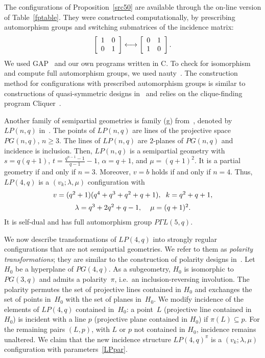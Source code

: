 \documentclass[12pt, reqno]{amsart}
\begin{document}
The configurations of Proposition~\ref{src50} are
available through the on-line version of Table~\ref{fptable}. They were
constructed computationally, by prescribing automorphism groups and
switching submatrices of the incidence matrix:
$$\left[\begin{array}{c c} 1 & 0\\ 0 & 1\\ \end{array}\right] \longleftrightarrow
\left[\begin{array}{c c} 0 & 1\\ 1 & 0\\ \end{array}\right].$$
We used GAP~\cite{GAP4} and our own programs written in C. To check for
isomorphism and compute full automorphism groups, we used nauty~\cite{MP14}.
The construction method for configurations with prescribed automorphism groups
is similar to constructions of quasi-symmetric designs in~\cite{KVK20, VK20} and
relies on the clique-finding program Cliquer~\cite{NO03}.

Another family of semipartial geometries is family (g) from~\cite{DT78}, denoted by $LP(n,q)$ in~\cite{DV95,FDC03}.
The points of $LP(n,q)$ are lines of the projective space $PG(n,q)$, $n\ge 3$. The lines of $LP(n,q)$ are
$2$-planes of $PG(n,q)$ and incidence is inclusion. Then, $LP(n,q)$ is a semipartial geometry with $s=q(q+1)$, $t=\frac{q^{n-1}-1}{q-1}-1$,
$\alpha=q+1$, and $\mu=(q+1)^2$. It is a partial geometry if and only if $n=3$. Moreover,
$v=b$ holds if and only if $n=4$. Thus, $LP(4,q)$ is a $(v_k;\lambda,\mu)$ configuration with
\begin{equation}\label{LPpar}
\begin{array}{c}
v=(q^2+1)(q^4+q^3+q^2+q+1), \kern 2mm k=q^2+q+1,\\[2mm]
\lambda=q^3+2q^2+q-1, \kern 4mm \mu=(q+1)^2.
\end{array}
\end{equation}
It is self-dual and has full automorphism group $P\Gamma L(5,q)$.

We now describe transformations of $LP(4,q)$ into strongly regular configurations that are not semipartial
geometries. We refer to them as \emph{polarity transformations}; they are similar to the construction of
polarity designs in~\cite{JT09}. Let~$H_0$ be a hyper\-plane
of $PG(4,q)$. As a subgeometry, $H_0$ is isomorphic to $PG(3,q)$ and admits a polarity~$\pi$, i.e.\ an inclusion-reversing
involution. The polarity permutes the set of projective lines contained in $H_0$ and exchanges the set of points in~$H_0$ with
the set of planes in~$H_0$. We modify incidence
of the elements of $LP(4,q)$ contained in~$H_0$: a point~$L$ (projective line contained in $H_0$) is
incident with a line $p$ (projective plane contained in $H_0$) if $\pi(L)\subseteq p$. For the remaining pairs
$(L,p)$, with $L$ or $p$ not contained in $H_0$, incidence remains unaltered. We claim that the
new incidence structure $LP(4,q)^\pi$ is a $(v_k;\lambda,\mu)$ configuration with parameters~\eqref{LPpar}.
\end{document}
